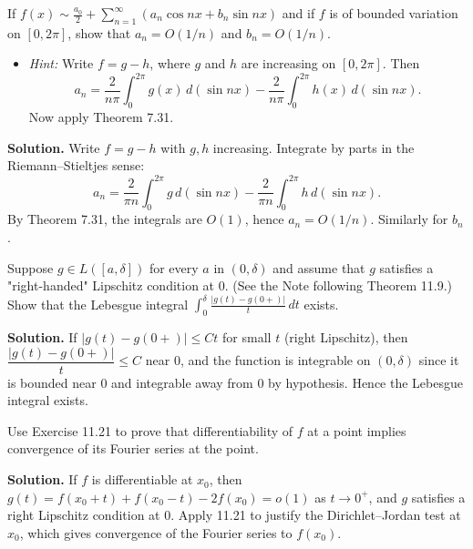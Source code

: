 \begin{problembox}
If $f(x) \sim \frac{a_0}{2} + \sum_{n=1}^\infty (a_n \cos nx + b_n \sin nx)$ and if $f$ is of bounded variation on $[0, 2\pi]$, show that $a_n = O(1/n)$ and $b_n = O(1/n)$.
\begin{itemize}
\item \textit{Hint:} Write $f = g - h$, where $g$ and $h$ are increasing on $[0, 2\pi]$. Then
\[
a_n = \frac{2}{n\pi} \int_0^{2\pi} g(x) \, d(\sin nx) - \frac{2}{n\pi} \int_0^{2\pi} h(x) \, d(\sin nx).
\]
Now apply Theorem 7.31.
\end{itemize}
\end{problembox}

\noindent\textbf{Solution.}
Write $f=g-h$ with $g,h$ increasing. Integrate by parts in the Riemann–Stieltjes sense:
\[a_n=\frac{2}{\pi n}\int_0^{2\pi} g\,d(\sin nx)-\frac{2}{\pi n}\int_0^{2\pi} h\,d(\sin nx).\]
By Theorem 7.31, the integrals are $O(1)$, hence $a_n=O(1/n)$. Similarly for $b_n$.

\begin{problembox}
Suppose $g \in L([a, \delta])$ for every $a$ in $(0, \delta)$ and assume that $g$ satisfies a "right-handed" Lipschitz condition at 0. (See the Note following Theorem 11.9.) Show that the Lebesgue integral $\int_0^\delta \frac{|g(t) - g(0+)|}{t} \, dt$ exists.
\end{problembox}

\noindent\textbf{Solution.}
If $|g(t)-g(0+)|\le C t$ for small $t$ (right Lipschitz), then $\dfrac{|g(t)-g(0+)|}{t}\le C$ near $0$, and the function is integrable on $(0,\delta)$ since it is bounded near $0$ and integrable away from $0$ by hypothesis. Hence the Lebesgue integral exists.

\begin{problembox}
Use Exercise 11.21 to prove that differentiability of $f$ at a point implies convergence of its Fourier series at the point.
\end{problembox}

\noindent\textbf{Solution.}
If $f$ is differentiable at $x_0$, then $g(t)=f(x_0+t)+f(x_0-t)-2f(x_0)=o(1)$ as $t\to0^+$, and $g$ satisfies a right Lipschitz condition at $0$. Apply 11.21 to justify the Dirichlet–Jordan test at $x_0$, which gives convergence of the Fourier series to $f(x_0)$.

